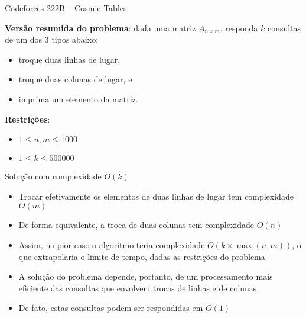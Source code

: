 \begin{frame}[fragile]{Codeforces 222B -- Cosmic Tables}

    \textbf{Versão resumida do problema}: dada uma matriz $A_{n\times m}$, responda $k$ consultas 
        de um dos 3 tipos abaixo:

    \begin{itemize}
        \item troque duas linhas de lugar,
        \item troque duas colunas de lugar, e
        \item imprima um elemento da matriz.
    \end{itemize}

    \vspace{0.1in}
    \textbf{Restrições}: 

    \begin{itemize}
        \item $1\leq n, m\leq 1000$
        \item $1\leq k\leq 500000$
    \end{itemize}

\end{frame}

\begin{frame}[fragile]{Solução com complexidade $O(k)$}

    \begin{itemize}
        \item Trocar efetivamente os elementos de duas linhas de lugar tem complexidade $O(m)$

        \item De forma equivalente, a troca de duas colunas tem complexidade $O(n)$

        \item Assim, no pior caso o algoritmo teria complexidade $O(k\times \max(n, m))$, o que 
            extrapolaria o limite de tempo, dadas as restrições do problema

        \item A solução do problema depende, portanto, de um processamento mais eficiente das
            consultas que envolvem trocas de linhas e de colunas

        \item De fato, estas consultas podem ser respondidas em $O(1)$
    \end{itemize}

\end{frame}

